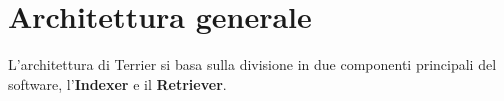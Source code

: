 \section{Architettura generale}

L'architettura di Terrier si basa sulla divisione in due componenti principali del software, l'\textbf{Indexer} e il \textbf{Retriever}.